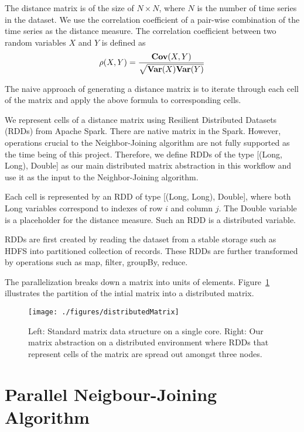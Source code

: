 The distance matrix is of the size of  $N \times N$, where $N$ is the number of time series in the dataset. We use the correlation coefficient of a pair-wise combination of the time series as the distance measure. The correlation coefficient between two random variables $X$ and $Y$ is defined as $$\rho(X,Y) = \frac{{\bf
		Cov}(X,Y)}{\sqrt{{\bf Var}(X){\bf Var}(Y)}}$$

The naive approach of generating a distance matrix is to iterate through each cell of the matrix and apply the above formula to corresponding cells.  

We represent cells of a distance matrix using Resilient Distributed Datasets (RDDs) from Apache Spark\cite{zaharia2016apache}. There are native matrix in the Spark. However, operations crucial to the Neighbor-Joining algorithm are not fully supported as the time being of this project. Therefore, we define RDDs of the type \textsf{[(Long, Long), Double]} as our main distributed matrix abstraction in this workflow and use it as the input to the Neighbor-Joining algorithm.

Each cell is represented by an RDD of type \textsf{[(Long, Long), Double]}, where both \textsf{Long} variables correspond to indexes of row $i$ and column $j$. The \textsf{Double} variable is a placeholder for the distance measure. Such an RDD is a distributed variable. 

RDDs are first created by reading the dataset from a stable storage such as HDFS into partitioned collection of records. These RDDs are further transformed by operations such as \textsf{map}, \textsf{filter}, \textsf{groupBy}, \textsf{reduce}. 

The parallelization breaks down a matrix into units of elements. Figure~\ref{fig:dmdistribution} illustrates the partition of the intial matrix into a distributed matrix. 

\begin{figure}
	\texttt{[image: ./figures/distributedMatrix]}	
	{\caption{Left: Standard matrix data structure on a single core. Right: Our matrix abstraction on a distributed environment where RDDs that represent cells of the matrix are spread out amongst three nodes.}	
		\label{fig:dmdistribution}}
\end{figure}

\section{Parallel Neigbour-Joining Algorithm}

